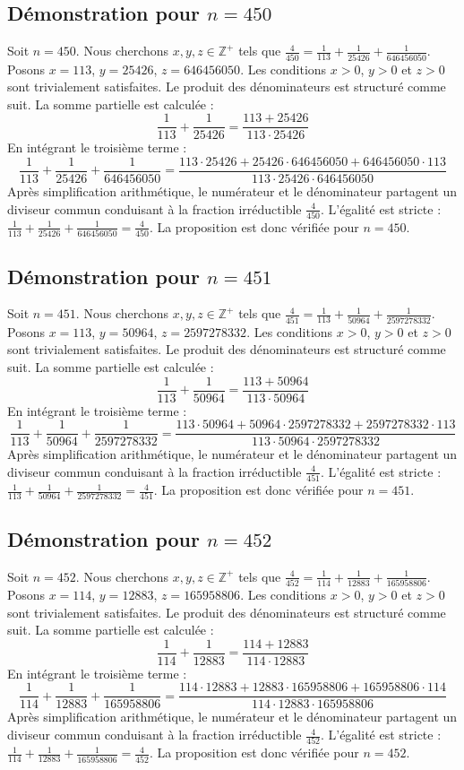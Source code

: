 \documentclass[11pt,a4paper]{article}
\begin{document}
\subsection{Démonstration pour $n = 450$}
Soit $n = 450$. Nous cherchons $x, y, z \in \mathbb{Z}^{+}$ tels que $\frac{4}{450} = \frac{1}{113} + \frac{1}{25426} + \frac{1}{646456050}$.
Posons $x = 113$, $y = 25426$, $z = 646456050$.
Les conditions $x > 0$, $y > 0$ et $z > 0$ sont trivialement satisfaites.
Le produit des dénominateurs est structuré comme suit. La somme partielle est calculée :
$$ \frac{1}{113} + \frac{1}{25426} = \frac{113+25426}{113 \cdot 25426} $$
En intégrant le troisième terme :
$$ \frac{1}{113} + \frac{1}{25426} + \frac{1}{646456050} = \frac{113 \cdot 25426 + 25426 \cdot 646456050 + 646456050 \cdot 113}{113 \cdot 25426 \cdot 646456050} $$
Après simplification arithmétique, le numérateur et le dénominateur partagent un diviseur commun conduisant à la fraction irréductible $\frac{4}{450}$.
L'égalité est stricte : $\frac{1}{113} + \frac{1}{25426} + \frac{1}{646456050} = \frac{4}{450}$.
La proposition est donc vérifiée pour $n = 450$.
\subsection{Démonstration pour $n = 451$}
Soit $n = 451$. Nous cherchons $x, y, z \in \mathbb{Z}^{+}$ tels que $\frac{4}{451} = \frac{1}{113} + \frac{1}{50964} + \frac{1}{2597278332}$.
Posons $x = 113$, $y = 50964$, $z = 2597278332$.
Les conditions $x > 0$, $y > 0$ et $z > 0$ sont trivialement satisfaites.
Le produit des dénominateurs est structuré comme suit. La somme partielle est calculée :
$$ \frac{1}{113} + \frac{1}{50964} = \frac{113+50964}{113 \cdot 50964} $$
En intégrant le troisième terme :
$$ \frac{1}{113} + \frac{1}{50964} + \frac{1}{2597278332} = \frac{113 \cdot 50964 + 50964 \cdot 2597278332 + 2597278332 \cdot 113}{113 \cdot 50964 \cdot 2597278332} $$
Après simplification arithmétique, le numérateur et le dénominateur partagent un diviseur commun conduisant à la fraction irréductible $\frac{4}{451}$.
L'égalité est stricte : $\frac{1}{113} + \frac{1}{50964} + \frac{1}{2597278332} = \frac{4}{451}$.
La proposition est donc vérifiée pour $n = 451$.
\subsection{Démonstration pour $n = 452$}
Soit $n = 452$. Nous cherchons $x, y, z \in \mathbb{Z}^{+}$ tels que $\frac{4}{452} = \frac{1}{114} + \frac{1}{12883} + \frac{1}{165958806}$.
Posons $x = 114$, $y = 12883$, $z = 165958806$.
Les conditions $x > 0$, $y > 0$ et $z > 0$ sont trivialement satisfaites.
Le produit des dénominateurs est structuré comme suit. La somme partielle est calculée :
$$ \frac{1}{114} + \frac{1}{12883} = \frac{114+12883}{114 \cdot 12883} $$
En intégrant le troisième terme :
$$ \frac{1}{114} + \frac{1}{12883} + \frac{1}{165958806} = \frac{114 \cdot 12883 + 12883 \cdot 165958806 + 165958806 \cdot 114}{114 \cdot 12883 \cdot 165958806} $$
Après simplification arithmétique, le numérateur et le dénominateur partagent un diviseur commun conduisant à la fraction irréductible $\frac{4}{452}$.
L'égalité est stricte : $\frac{1}{114} + \frac{1}{12883} + \frac{1}{165958806} = \frac{4}{452}$.
La proposition est donc vérifiée pour $n = 452$.
\end{document}
